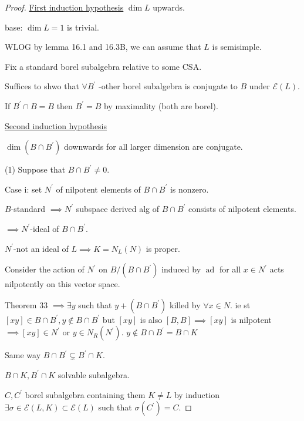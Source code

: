\documentclass{article}
\theoremstyle{definition}
\begin{document}
    \begin{proof}
        \underline{First induction hypothesis} \(\dim L\) upwards.

        base: \(\dim L = 1\) is trivial.

        WLOG by lemma 16.1 and 16.3B, we can assume that \(L\) is semisimple.

        Fix a standard borel subalgebra relative to some CSA.

        Suffices to shwo that \(\forall B^{\prime}\) -other borel subalgebra is conjugate to \(B\) under \(\mathscr{E} (L)\).

        If \(B^{\prime} \cap B = B\) then \(B^{\prime} = B\) by maximality (both are borel).

        \underline{Second induction hypothesis} 

        \(\dim (B\cap B^{\prime})\) downwards for all larger dimension are conjugate.

        (1) Suppose that \(B\cap B^{\prime} \neq 0\).

        Case i: set \(N^{\prime}\) of nilpotent elements of \(B \cap B^{\prime}\) is nonzero.
        
        \(B\)-standard \(\implies N^{\prime}\) subspace derived alg of \(B \cap B^{\prime}\) consists of nilpotent elements.

        \(\implies N^{\prime}\)-ideal of \(B\cap B^{\prime}\).

        \(N^{\prime}\)-not an ideal of \(L \implies K = N_L(N)\) is proper.

        Consider the action of \(N^{\prime}\) on \(B / (B \cap B^{\prime})\) induced by \(\operatorname{ad}\) for all \(x\in N^{\prime}\) acts nilpotently on this vector space.

        Theorem 33 \(\implies \exists y\) such that \(y + (B\cap B^{\prime})\) killed by \(\forall x\in N\). ie st \([xy]\in B\cap B^{\prime} , y \notin B\cap B^{\prime}\) but \([xy]\) is also \([B,B] \implies [xy]\) is nilpotent \(\implies [xy] \in N^{\prime}\) or \(y\in N_R(N^{\prime})\). \(y\notin B\cap B^{\prime} = B\cap K\)
        
        Same way \(B\cap B^{\prime} \subsetneq B^{\prime} \cap K\). 
        
        \(B\cap K, B^{\prime} \cap K\) solvable subalgebra.

        \(C,C^{\prime}\) borel subalgebra containing them \(K\neq L\) by induction \(\exists \sigma \in \mathscr{E} (L,K) \subset \mathscr{E} (L)\) such that \(\sigma (C^{\prime})=C\).
        

\end{proof}
\end{document}
